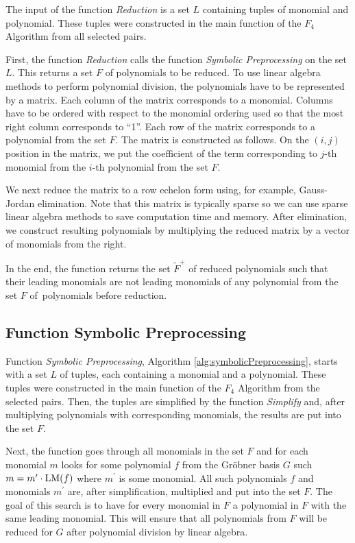 The input of the function \textit{Reduction} is a set $L$ containing tuples of monomial and polynomial. These tuples were constructed in the main function of the $F_4$ Algorithm from all selected pairs.

First, the function \textit{Reduction} calls the function \textit{Symbolic Preprocessing} on the set $L$. This returns a set $F$ of polynomials to be reduced. To use linear algebra methods to perform polynomial division, the polynomials have to be represented by a matrix. Each column of the matrix corresponds to a monomial. Columns have to be ordered with respect to the monomial ordering used so that the most right column corresponds to ``1''. Each row of the matrix corresponds to a polynomial from the set $F$. The matrix is constructed as follows. On the $(i, j)$ position in the matrix, we put the coefficient of the term corresponding to $j$-th monomial from the $i$-th polynomial from the set $F$.

We next reduce the matrix to a row echelon form using, for example, Gauss-Jordan elimination. Note that this matrix is typically sparse so we can use sparse linear algebra methods to save computation time and memory. After elimination, we construct resulting polynomials by multiplying the reduced matrix by a vector of monomials from the right.

In the end, the function returns the set $\tilde{F}^+$ of reduced polynomials such that their leading monomials are not leading monomials of any polynomial from the set $F$ of~polynomials before reduction.



\subsection{Function Symbolic Preprocessing}
Function \textit{Symbolic Preprocessing}, Algorithm \ref{alg:symbolicPreprocessing}, starts with a set $L$ of tuples, each containing a monomial and a polynomial. These tuples were constructed in the main function of the $F_4$ Algorithm from the selected pairs. Then, the tuples are simplified by the function \textit{Simplify} and, after multiplying polynomials with corresponding monomials, the results are put into the set $F$.

Next, the function goes through all monomials in the set $F$ and for each monomial $m$ looks for some polynomial $f$ from the Gr\"obner basis $G$ such $m = m^\prime \cdot\operatorname{LM}(f)$ where $m^\prime$ is some monomial. All such polynomials $f$ and monomials $m^\prime$ are, after simplification, multiplied and put into the set $F$. The goal of this search is to have for every monomial in $F$ a polynomial in $F$ with the same leading monomial. This will ensure that all polynomials from $F$ will be reduced for $G$ after polynomial division by linear algebra.

